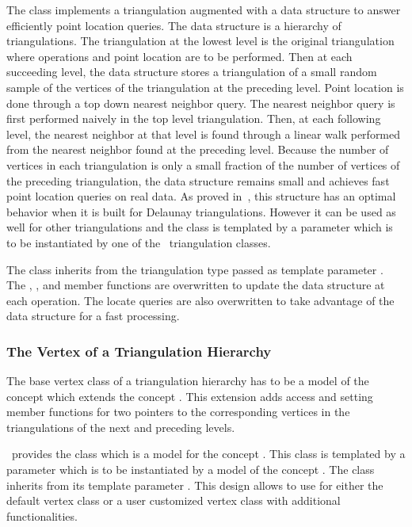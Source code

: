 The class 
implements a triangulation augmented with
a data structure to answer efficiently  point location queries.
The data structure is a hierarchy 
of triangulations. The triangulation at the lowest level is
the original triangulation where operations and point location are to 
be performed.
Then at each succeeding level, the data structure
stores a triangulation of a small random sample of the vertices
of the triangulation at the preceding level. Point location
is done through a top down nearest neighbor query.
The nearest neighbor query is first
performed naively in the top level triangulation.
Then, at each following level, the nearest neighbor at that level
is found through a linear walk performed from
the nearest neighbor found at the preceding level.
Because the number of vertices in each triangulation is only a small
fraction of the number of vertices of the preceding triangulation,
the data structure remains small and achieves fast point location 
queries  on real
data. As proved in~\cite{d-iirdt-98}, this structure has an optimal behavior
when it is built for Delaunay triangulations.
However it can be used as well for other triangulations
and the class  is templated by a parameter
which is to be instantiated by one of the \cgal\ triangulation
classes. 

The class  inherits from the
triangulation type passed as template parameter . 
The , , and  member functions
are  overwritten to update the data structure at each operation.
The locate queries are also overwritten to take advantage of the data
structure for a fast processing.

\subsubsection{The Vertex of a Triangulation Hierarchy}
The base vertex class  of a triangulation hierarchy 
has to be a model of the
concept
 which extends
the concept .
This extension adds
access and setting member functions 
for two pointers  to the corresponding vertices in the 
triangulations of the next and preceding levels.

\cgal\ provides the class 
which is a model for the concept 
.
This class is templated by a parameter 
which is to be instantiated by a model of  the concept
.
The class  inherits
from its template parameter .
This design allows to use for   
either the default
vertex class or a user customized
vertex class with additional functionalities.

